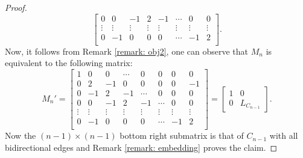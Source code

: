 \documentclass[11pt,reqno]{amsart}
\theoremstyle{definition}
\theoremstyle{plain}
\begin{document}
\begin{proof}
\[\begin{bmatrix}
	0 & 0 & -1 & 2 & -1 & \cdots & 0 & 0  \\
\vdots & \vdots & \vdots & \vdots & \vdots & \vdots & \vdots& \vdots  \\
	0 & -1 & 0 & 0 & 0 & \cdots & -1 & 2 \\
\end{bmatrix}. 
\]
Now, it follows from Remark \ref{remark: obj2}, one can observe that $M_n$ is equivalent to the following matrix:
\[
M_n'=\begin{bmatrix}
	1 & 0 & 0 & \cdots & 0 & 0 & 0 & 0 \\
	0 & 2 & -1 & 0 & 0 & 0 & 0 & -1   \\
	0 & -1 & 2 & -1 & \cdots & 0 & 0 & 0 \\
	0 & 0 & -1 & 2 & -1 & \cdots & 0 & 0  \\
	\vdots & \vdots & \vdots & \vdots & \vdots & \vdots & \vdots& \vdots  \\
	0 & -1 & 0 & 0 & 0 & \cdots & -1 & 2 \\
\end{bmatrix} = \left[ \begin{array}{c|c}
1 & 0 \\
\hline
0 &L_{C_{n-1}}
\end{array} \right].
\]
Now the $(n-1) \times (n-1)$ bottom right submatrix is that of $C_{n-1}$ with all bidirectional edges and Remark \ref{remark: embedding} proves the claim.


\end{proof}
\end{document}
